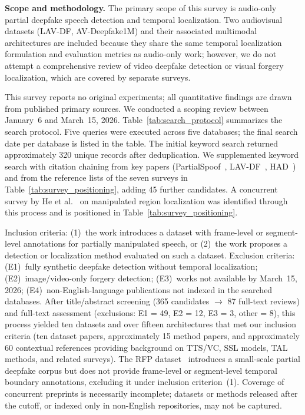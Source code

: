 \documentclass[journal]{IEEEtran}
\begin{document}
\textbf{Scope and methodology.} The primary scope of this survey is audio-only partial deepfake speech detection and temporal localization. Two audiovisual datasets (LAV-DF, AV-Deepfake1M) and their associated multimodal architectures are included because they share the same temporal localization formulation and evaluation metrics as audio-only work; however, we do not attempt a comprehensive review of video deepfake detection or visual forgery localization, which are covered by separate surveys.

This survey reports no original experiments; all quantitative findings are drawn from published primary sources. We conducted a scoping review between January~6 and March~15, 2026. Table~\ref{tab:search_protocol} summarizes the search protocol. Five queries were executed across five databases; the final search date per database is listed in the table. The initial keyword search returned approximately 320 unique records after deduplication. We supplemented keyword search with citation chaining from key papers (PartialSpoof~\cite{zhang2023partialspoof}, LAV-DF~\cite{cai2022lavdf}, HAD~\cite{yi2021had}) and from the reference lists of the seven surveys in Table~\ref{tab:survey_positioning}, adding 45 further candidates. A concurrent survey by He et al.~\cite{he2025mrlsurvey} on manipulated region localization was identified through this process and is positioned in Table~\ref{tab:survey_positioning}.

Inclusion criteria: (1)~the work introduces a dataset with frame-level or segment-level annotations for partially manipulated speech, or (2)~the work proposes a detection or localization method evaluated on such a dataset. Exclusion criteria: (E1)~fully synthetic deepfake detection without temporal localization; (E2)~image/video-only forgery detection; (E3)~works not available by March~15, 2026; (E4)~non-English-language publications not indexed in the searched databases. After title/abstract screening (365 candidates $\rightarrow$ 87 full-text reviews) and full-text assessment (exclusions: E1 = 49, E2 = 12, E3 = 3, other = 8), this process yielded ten datasets and over fifteen architectures that met our inclusion criteria (ten dataset papers, approximately 15 method papers, and approximately 60 contextual references providing background on TTS/VC, SSL models, TAL methods, and related surveys). The RFP dataset~\cite{alali2024deepfakesurvey} introduces a small-scale partial deepfake corpus but does not provide frame-level or segment-level temporal boundary annotations, excluding it under inclusion criterion~(1). Coverage of concurrent preprints is necessarily incomplete; datasets or methods released after the cutoff, or indexed only in non-English repositories, may not be captured.
\end{document}
